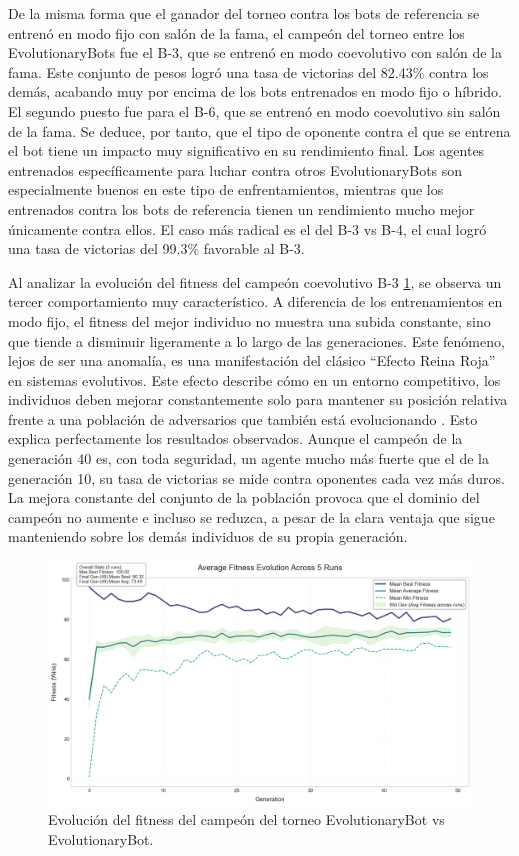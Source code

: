 De la misma forma que el ganador del torneo contra los bots de referencia se entrenó en modo fijo con salón de la fama, el campeón del torneo entre los EvolutionaryBots fue el B-3, que se entrenó en modo coevolutivo con salón de la fama. Este conjunto de pesos logró una tasa de victorias del 82.43\% contra los demás, acabando muy por encima de los bots entrenados en modo fijo o híbrido. El segundo puesto fue para el B-6, que se entrenó en modo coevolutivo sin salón de la fama. Se deduce, por tanto, que el tipo de oponente contra el que se entrena el bot tiene un impacto muy significativo en su rendimiento final. Los agentes entrenados específicamente para luchar contra otros EvolutionaryBots son especialmente buenos en este tipo de enfrentamientos, mientras que los entrenados contra los bots de referencia tienen un rendimiento mucho mejor únicamente contra ellos. El caso más radical es el del B-3 vs B-4, el cual logró una tasa de victorias del 99.3\% favorable al B-3.

Al analizar la evolución del fitness del campeón coevolutivo B-3 \ref{fig:coevo_fitness_evolution}, se observa un tercer comportamiento muy característico. A diferencia de los entrenamientos en modo fijo, el fitness del mejor individuo no muestra una subida constante, sino que tiende a disminuir ligeramente a lo largo de las generaciones. Este fenómeno, lejos de ser una anomalía, es una manifestación del clásico ``Efecto Reina Roja'' en sistemas evolutivos. Este efecto describe cómo en un entorno competitivo, los individuos deben mejorar constantemente solo para mantener su posición relativa frente a una población de adversarios que también está evolucionando \cite{wikipedia_red_2025}. Esto explica perfectamente los resultados observados. Aunque el campeón de la generación 40 es, con toda seguridad, un agente mucho más fuerte que el de la generación 10, su tasa de victorias se mide contra oponentes cada vez más duros. La mejora constante del conjunto de la población provoca que el dominio del campeón no aumente e incluso se reduzca, a pesar de la clara ventaja que sigue manteniendo sobre los demás individuos de su propia generación.

\begin{figure}[H]
	\centering
	\includegraphics[width=1.0\textwidth]{img/coevo_fitness_evolution.png}
	\caption{Evolución del fitness del campeón del torneo EvolutionaryBot vs EvolutionaryBot.}
	\label{fig:coevo_fitness_evolution}
\end{figure}

